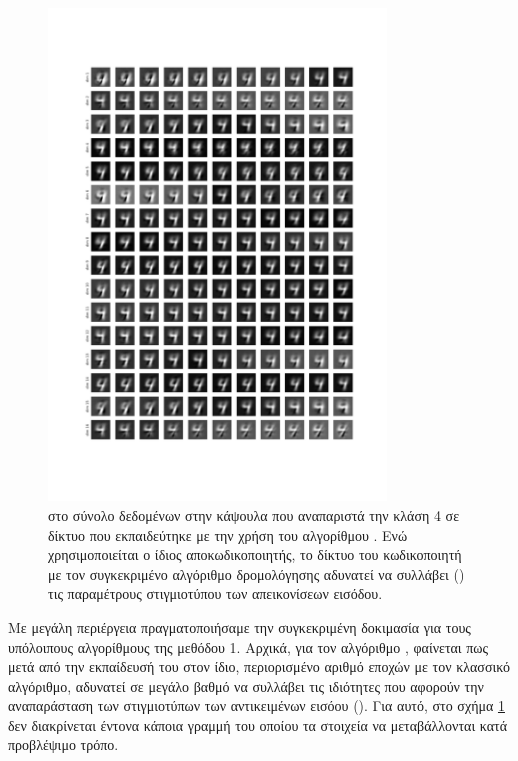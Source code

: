 \begin{figure}[h]
    \centering
    \includegraphics[width=0.8\textwidth]{images/chapter experiments/method 1/image 7/perturbations_19.png}
    \caption{ στο σύνολο δεδομένων  στην κάψουλα  που αναπαριστά την κλάση 4 σε δίκτυο που εκπαιδεύτηκε με την χρήση του αλγορίθμου . Ενώ χρησιμοποιείται ο ίδιος αποκωδικοποιητής, το δίκτυο του κωδικοποιητή με τον συγκεκριμένο αλγόριθμο δρομολόγησης αδυνατεί να συλλάβει () τις παραμέτρους στιγμιοτύπου των απεικονίσεων εισόδου.}
    \label{fig:exp_method_1_special_perturb_2}
  \end{figure}
Με μεγάλη περιέργεια πραγματοποιήσαμε την συγκεκριμένη δοκιμασία για τους υπόλοιπους αλγορίθμους της μεθόδου 1. Αρχικά, για τον αλγόριθμο , φαίνεται πως μετά από την εκπαίδευσή του στον ίδιο, περιορισμένο αριθμό εποχών με τον κλασσικό αλγόριθμο, αδυνατεί σε μεγάλο βαθμό να συλλάβει τις ιδιότητες που αφορούν την αναπαράσταση των στιγμιοτύπων των αντικειμένων εισόου (). Για αυτό, στο σχήμα \ref{fig:exp_method_1_special_perturb_2} δεν διακρίνεται έντονα κάποια γραμμή του οποίου τα στοιχεία να μεταβάλλονται κατά προβλέψιμο τρόπο.\par

